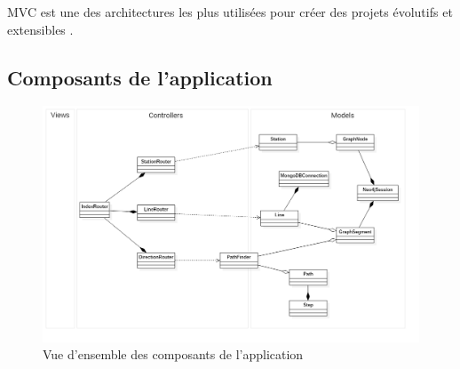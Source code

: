 MVC est une des architectures les plus utilisées pour créer des projets évolutifs et extensibles \cite{refMVC}.

\subsection{Composants de l'application}

\begin{figure}
	\includegraphics[width=\textwidth]{img/ClassDiagram.png}
	\caption{Vue d'ensemble des composants de l'application}
	\label{fig:classDiagram}
\end{figure}	
